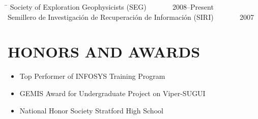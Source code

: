 \documentclass{res}
\begin{document}
\begin{resume}
\begin{tabbing}

\hspace{4.9in}\= \kill %
Society of Exploration Geophysicists (SEG) \> ~~~~~~ 2008--Present\\
Semillero de Investigación de Recuperación de Información (SIRI) \> ~~~~~~ 2007\\
\end{tabbing}\vspace{-15pt}


% 

\section{HONORS AND AWARDS}          
\begin{itemize}
	\item Top Performer of INFOSYS Training Program
	\item GEMIS Award for Undergraduate Project on Viper-SUGUI
	\item National Honor Society Stratford High School    
\end{itemize}


 
\end{resume}
\end{document}
